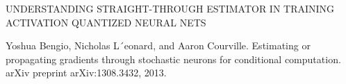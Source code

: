 UNDERSTANDING STRAIGHT-THROUGH ESTIMATOR IN TRAINING ACTIVATION QUANTIZED NEURAL NETS

Yoshua Bengio, Nicholas L´eonard, and Aaron Courville. Estimating or propagating gradients through stochastic neurons for conditional computation. arXiv preprint arXiv:1308.3432, 2013.
